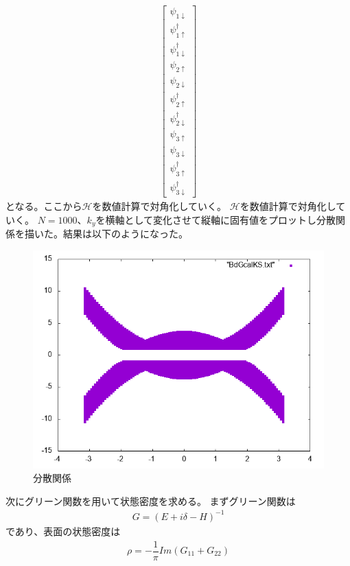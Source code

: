 \documentclass{jarticle}
\begin{document}
\begin{align}
\begin{bmatrix}
	\psi_{1\downarrow} \\ 
	\psi_{1\uparrow}^\dagger \\ 
	\psi_{1\downarrow}^\dagger \\ 
	\psi_{2\uparrow} \\ 
	\psi_{2\downarrow} \\ 
	\psi_{2\uparrow}^\dagger \\ 
	\psi_{2\downarrow}^\dagger \\ 
	\psi_{3\uparrow} \\ 
	\psi_{3\downarrow} \\ 
	\psi_{3\uparrow}^\dagger \\ 
	\psi_{3\downarrow}^\dagger
	\end{bmatrix} 
	\end{align}
	となる。ここから$\mathcal{H}$を数値計算で対角化していく。
$\mathcal{H}$を数値計算で対角化していく。			%
$N=1000$、$k_y$を横軸として変化させて縦軸に固有値をプロットし分散関係を描いた。結果は以下のようになった。\\		%
\begin{figure}[H]
	\centering
	\includegraphics[scale=0.7]{BdGcalKSs.png}			%
	\caption{分散関係}
\end{figure}
次にグリーン関数を用いて状態密度を求める。
まずグリーン関数は
\begin{align}
G=(E+i\delta-H)^{-1}
\end{align}
であり、表面の状態密度は
\begin{align}
\rho=-\dfrac{1}{\pi}Im(G_{11}+G_{22})
\end{align}
\end{document}
